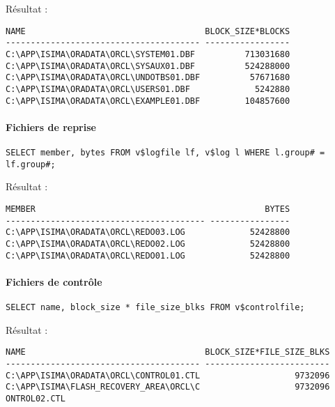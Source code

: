 Résultat :

\begin{verbatim}
NAME                                    BLOCK_SIZE*BLOCKS                       
--------------------------------------- -----------------                       
C:\APP\ISIMA\ORADATA\ORCL\SYSTEM01.DBF          713031680                       
C:\APP\ISIMA\ORADATA\ORCL\SYSAUX01.DBF          524288000                       
C:\APP\ISIMA\ORADATA\ORCL\UNDOTBS01.DBF          57671680                       
C:\APP\ISIMA\ORADATA\ORCL\USERS01.DBF             5242880                       
C:\APP\ISIMA\ORADATA\ORCL\EXAMPLE01.DBF         104857600                       
\end{verbatim}

\paragraph{Fichiers de reprise}
\begin{verbatim}
SELECT member, bytes FROM v$logfile lf, v$log l WHERE l.group# = lf.group#;
\end{verbatim}

Résultat :

\begin{verbatim}
MEMBER                                              BYTES                       
---------------------------------------- ----------------                       
C:\APP\ISIMA\ORADATA\ORCL\REDO03.LOG             52428800                       
C:\APP\ISIMA\ORADATA\ORCL\REDO02.LOG             52428800                       
C:\APP\ISIMA\ORADATA\ORCL\REDO01.LOG             52428800                       
\end{verbatim}

\paragraph{Fichiers de contrôle}
\begin{verbatim}
SELECT name, block_size * file_size_blks FROM v$controlfile;
\end{verbatim}

Résultat :

\begin{verbatim}
NAME                                    BLOCK_SIZE*FILE_SIZE_BLKS               
--------------------------------------- -------------------------               
C:\APP\ISIMA\ORADATA\ORCL\CONTROL01.CTL                   9732096               
C:\APP\ISIMA\FLASH_RECOVERY_AREA\ORCL\C                   9732096               
ONTROL02.CTL  
\end{verbatim}

